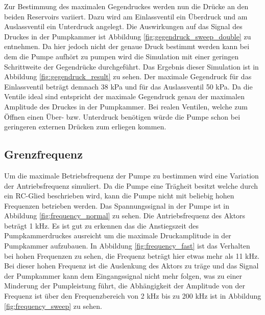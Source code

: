 \documentclass[fontsize=12pt, a4paper]{scrartcl}
\begin{document}
Zur Bestimmung des maximalen Gegendruckes werden nun die Drücke an den beiden Reservoirs variiert. Dazu wird am Einlassventil ein Überdruck und am Auslassventil ein Unterdruck angelegt. Die Auswirkungen auf das Signal des Druckes in der Pumpkammer ist Abbildung \ref{fig:gegendruck_sweep_double} zu entnehmen. Da hier jedoch nicht der genaue Druck bestimmt werden kann bei dem die Pumpe aufhört zu pumpen wird die Simulation mit einer geringen Schrittweite der Gegendrücke durchgeführt. Das Ergebnis dieser Simulation ist in Abbildung \ref{fig:gegendruck_result} zu sehen. Der maximale Gegendruck für das Einlassventil beträgt demnach 38 kPa und für das Auslassventil 50 kPa. Da die Ventile ideal sind entspricht der maximale Gegendruck genau der maximalen Amplitude des Druckes in der Pumpkammer. Bei realen Ventilen, welche zum Öffnen einen Über- bzw. Unterdruck benötigen würde die Pumpe schon bei geringeren externen Drücken zum erliegen kommen.

\subsection{Grenzfrequenz}

Um die maximale Betriebsfrequenz der Pumpe zu bestimmen wird eine Variation der Antriebsfrequenz simuliert. Da die Pumpe eine Trägheit besitzt welche durch ein RC-Glied beschrieben wird, kann die Pumpe nicht mit beliebig hohen Frequenzen betrieben werden. Das Spannungssignal in der Pumpe ist in Abbildung \ref{fig:frequency_normal} zu sehen. Die Antriebsfrequenz des Aktors beträgt 1 kHz. Es ist gut zu erkennen das die Anstiegszeit des Pumpkammerdruckes ausreicht um die maximale Druckamplitude in der Pumpkammer aufzubauen. In Abbildung \ref{fig:frequency_fast} ist das Verhalten bei hohen Frequenzen zu sehen, die Frequenz beträgt hier etwas mehr als 11 kHz. Bei dieser hohen Frequenz ist die Auslenkung des Aktors zu träge und das Signal der Pumpkammer kann dem Eingangssignal nicht mehr folgen, was zu einer Minderung der Pumpleistung führt, die Abhängigkeit der Amplitude von der Frequenz ist über den Frequenzbereich von 2 kHz bis zu 200 kHz ist in Abbildung \ref{fig:frequency_sweep} zu sehen.
 
\end{document}
